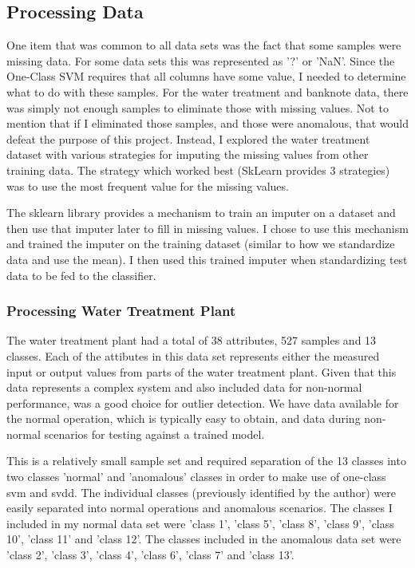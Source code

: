 \documentclass[journal]{IEEEtran}
\begin{document}
\subsection{Processing Data}
One item that was common to all data sets was the fact that some samples were missing data. For some data sets this was represented as '?' or 'NaN'. Since the One-Class SVM requires that all columns have some value, I needed to determine what to do with these samples. For the water treatment and banknote data, there was simply not enough samples to eliminate those with missing values. Not to mention that if I eliminated those samples, and those were anomalous, that would defeat the purpose of this project. Instead, I explored the water treatment dataset with various strategies for imputing the missing values from other training data. The strategy which worked best (SkLearn provides 3 strategies) was to use the most frequent value for the missing values.

The sklearn library provides a mechanism to train an imputer on a dataset and then use that imputer later to fill in missing values. I chose to use this mechanism and trained the imputer on the training dataset (similar to how we standardize data and use the mean). I then used this trained imputer when standardizing test data to be fed to the classifier.

\subsubsection{Processing Water Treatment Plant}
The water treatment plant had a total of 38 attributes, 527 samples and 13 classes. Each of the attibutes in this data set represents either the measured input or output values from parts of the water treatment plant. Given that this data represents a complex system and also included data for non-normal performance, was a good choice for outlier detection. We have data available for the normal operation, which is typically easy to obtain, and data during non-normal scenarios for testing against a trained model.

This is a relatively small sample set and required separation of the 13 classes into two classes 'normal' and 'anomalous' classes in order to make use of one-class svm and svdd. The individual classes (previously identified by the author) were easily separated into normal operations and anomalous scenarios. The classes I included in my normal data set were 'class 1', 'class 5', 'class 8', 'class 9', 'class 10', 'class 11' and 'class 12'. The classes included in the anomalous data set were 'class 2', 'class 3', 'class 4', 'class 6', 'class 7' and 'class 13'.
\end{document}
